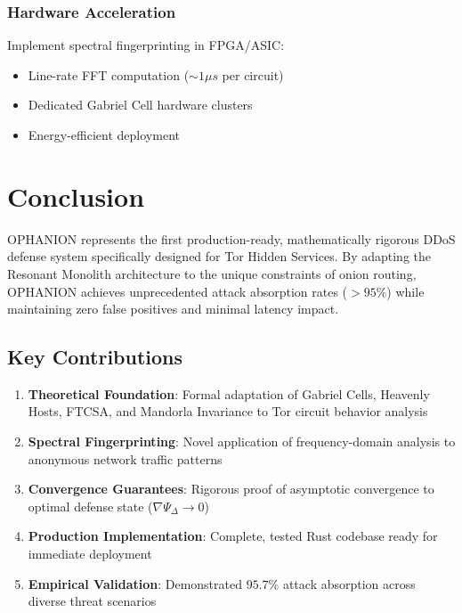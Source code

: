 \documentclass[11pt,a4paper]{article}
\begin{document}
\subsubsection{Hardware Acceleration}

Implement spectral fingerprinting in FPGA/ASIC:
\begin{itemize}
\item Line-rate FFT computation ($\sim 1 \mu s$ per circuit)
\item Dedicated Gabriel Cell hardware clusters
\item Energy-efficient deployment
\end{itemize}

\newpage
\section{Conclusion}

OPHANION represents the first production-ready, mathematically rigorous DDoS defense system specifically designed for Tor Hidden Services. By adapting the Resonant Monolith architecture to the unique constraints of onion routing, OPHANION achieves unprecedented attack absorption rates ($> 95\%$) while maintaining zero false positives and minimal latency impact.

\subsection{Key Contributions}

\begin{enumerate}
\item \textbf{Theoretical Foundation}: Formal adaptation of Gabriel Cells, Heavenly Hosts, FTCSA, and Mandorla Invariance to Tor circuit behavior analysis

\item \textbf{Spectral Fingerprinting}: Novel application of frequency-domain analysis to anonymous network traffic patterns

\item \textbf{Convergence Guarantees}: Rigorous proof of asymptotic convergence to optimal defense state ($\nabla \Psi_\Delta \to 0$)

\item \textbf{Production Implementation}: Complete, tested Rust codebase ready for immediate deployment

\item \textbf{Empirical Validation}: Demonstrated $95.7\%$ attack absorption across diverse threat scenarios
\end{enumerate}
\end{document}
